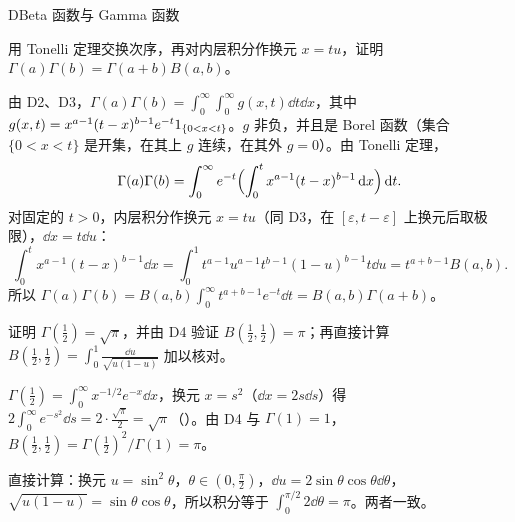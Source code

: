 \begin{probleme}[问题]{D}{Beta 函数与 Gamma 函数}
\begin{questions}
\item 用 Tonelli 定理交换次序，再对内层积分作换元 $x=tu$，证明 $\Gamma(a)\Gamma(b)=\Gamma(a+b)B(a,b)$。
\begin{solution}
由 D2、D3，$\Gamma(a)\Gamma(b)=\int_0^\infty\int_0^\infty g(x,t)\dd t\dd x$，其中 $g(x,t)=x^{a-1}(t-x)^{b-1}e^{-t}1_{\{0<x<t\}}$。$g$ 非负，并且是 Borel 函数（集合 $\{0<x<t\}$ 是开集，在其上 $g$ 连续，在其外 $g=0$）。由 Tonelli 定理，
\[
\Gamma(a)\Gamma(b)=\int_0^\infty e^{-t}\Bigl(\int_0^tx^{a-1}(t-x)^{b-1}\,\mathrm{d} x\Bigr)\,\mathrm{d} t .
\]
对固定的 $t>0$，内层积分作换元 $x=tu$（同 D3，在 $[\varepsilon,t-\varepsilon]$ 上换元后取极限），$\dd x=t\dd u$：
\[
\int_0^tx^{a-1}(t-x)^{b-1}\dd x=\int_0^1t^{a-1}u^{a-1}t^{b-1}(1-u)^{b-1}t\dd u=t^{a+b-1}B(a,b).
\]
所以 $\Gamma(a)\Gamma(b)=B(a,b)\int_0^\infty t^{a+b-1}e^{-t}\dd t=B(a,b)\Gamma(a+b)$。
\end{solution}

\item 证明 $\Gamma(\frac12)=\sqrt\pi$，并由 D4 验证 $B(\frac12,\frac12)=\pi$；再直接计算 $B(\frac12,\frac12)=\int_0^1\frac{\dd u}{\sqrt{u(1-u)}}$ 加以核对。
\begin{solution}
$\Gamma(\frac12)=\int_0^\infty x^{-1/2}e^{-x}\dd x$，换元 $x=s^2$（$\dd x=2s\dd s$）得 $2\int_0^\infty e^{-s^2}\dd s=2\cdot\frac{\sqrt\pi}2=\sqrt\pi$（）。由 D4 与 $\Gamma(1)=1$，$B(\frac12,\frac12)=\Gamma(\frac12)^2/\Gamma(1)=\pi$。

直接计算：换元 $u=\sin^2\theta$，$\theta\in(0,\frac\pi2)$，$\dd u=2\sin\theta\cos\theta\dd\theta$，$\sqrt{u(1-u)}=\sin\theta\cos\theta$，所以积分等于 $\int_0^{\pi/2}2\dd\theta=\pi$。两者一致。
\end{solution}
\end{questions}
\end{probleme}


